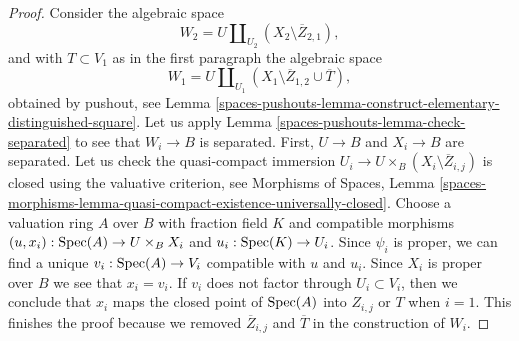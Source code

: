 \begin{proof}
\medskip\noindent
Consider the algebraic space
$$
W_2 = U \coprod\nolimits_{U_2} (X_2 \setminus \overline{Z}_{2, 1}),
$$
and with $T \subset V_1$ as in the first paragraph the algebraic space
$$
W_1 = U \coprod\nolimits_{U_1}
(X_1 \setminus \overline{Z}_{1, 2} \cup \overline{T}),
$$
obtained by pushout, see
Lemma \ref{spaces-pushouts-lemma-construct-elementary-distinguished-square}.
Let us apply Lemma \ref{spaces-pushouts-lemma-check-separated}
to see that $W_i \to B$ is separated. First,
$U \to B$ and $X_i \to B$ are separated. Let us check the quasi-compact
immersion $U_i \to U \times_B (X_i \setminus \overline{Z}_{i, j})$
is closed using the valuative criterion, see Morphisms of Spaces, Lemma
\ref{spaces-morphisms-lemma-quasi-compact-existence-universally-closed}.
Choose a valuation ring $A$ over $B$ with fraction field $K$ and
compatible morphisms $(u, x_i) : \operatorname{Spec}(A) \to U \times_B X_i$ and
$u_i : \operatorname{Spec}(K) \to U_i$. Since $\psi_i$ is proper, we
can find a unique $v_i : \operatorname{Spec}(A) \to V_i$ compatible with
$u$ and $u_i$. Since $X_i$ is proper over $B$ we see that $x_i = v_i$.
If $v_i$ does not factor through $U_i \subset V_i$, then we conclude
that $x_i$ maps the closed point of $\operatorname{Spec}(A)$ into $Z_{i, j}$ or
$T$ when $i = 1$. This finishes the proof because we removed
$\overline{Z}_{i, j}$ and $\overline{T}$ in the construction of $W_i$.


\end{proof}
